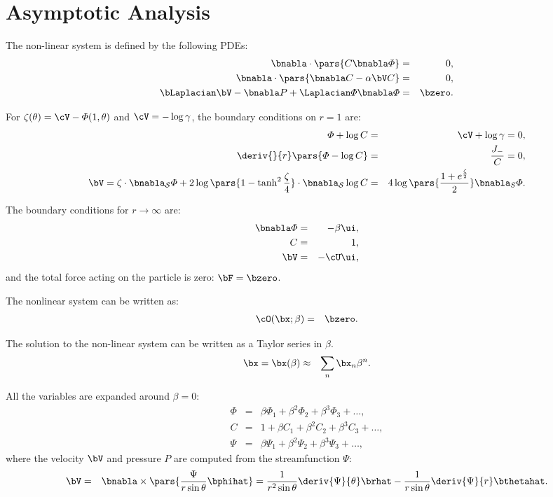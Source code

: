 
\section{Asymptotic Analysis} \label{asymptotic}

The non-linear system is defined by the following PDEs:
\label{PDEs}
\begin{eqnarray*}
\bnabla \cdot \pars{C \bnabla \varPhi} &=& 0, \\
\bnabla \cdot \pars{\bnabla C - \alpha \bV C} &=& 0, \\
\bLaplacian \bV - \bnabla P + \Laplacian \varPhi \bnabla \varPhi &=& \bzero.
\end{eqnarray*}

For $\zeta(\theta) = \cV - \varPhi(1, \theta)$ and 
$\cV = -\log \gamma$, the boundary conditions on $r = 1$ are:
\begin{eqnarray*}
\varPhi + \log C &=& \cV + \log \gamma = 0, \\
\deriv{}{r}\pars{\varPhi - \log C} &=& \frac{J_-}{C} = 0, \\
\bV = \zeta \cdot \bnabla_\mathcal{S} \varPhi 
+ 2\log\pars{1-\tanh^2\frac{\zeta}{4}} \cdot \bnabla_\mathcal{S} \log C
&=& 4\log\pars{\frac{1 + e^\frac{\zeta}{2}}{2}} \bnabla_S \varPhi.
\end{eqnarray*}

The boundary conditions for $r \rightarrow \infty$ are:
\begin{eqnarray*}
\bnabla \varPhi &=& -\beta \ui, \\
C &=& 1, \\
\bV &=& -\cU \ui,
\end{eqnarray*}
and the total force acting on the particle is zero: $\bF = \bzero$.

The nonlinear system can be written as: 
\begin{eqnarray*}
\cO(\bx;\beta) &=& \bzero.
\end{eqnarray*}

The solution to the non-linear system can be written as a Taylor series in $\beta$.
\begin{eqnarray*}
\bx = \bx(\beta) &\approx& \sum_n \bx_n \beta^n.
\end{eqnarray*}

All the variables are expanded around $\beta = 0$:
\begin{eqnarray*}
\varPhi &=& \beta \varPhi_1 + \beta^2 \varPhi_2 + \beta^3 \varPhi_3 + \ldots, \\
C &=& 1 + \beta C_1 + \beta^2 C_2 + \beta^3 C_3 + \ldots, \\
\Psi &=& \beta \Psi_1 + \beta^2 \Psi_2 + \beta^3 \Psi_3 + \ldots ,
\end{eqnarray*}
where the velocity $\bV$ and pressure $P$ are computed from the streamfunction $\Psi$:
\begin{eqnarray*}
\bV &=& \bnabla \times \pars{\frac{\Psi}{r \sin\theta} \bphihat} 
= \frac{1}{r^2 \sin\theta} \deriv{\Psi}{\theta} \brhat 
- \frac{1}{r \sin\theta} \deriv{\Psi}{r} \bthetahat.
\end{eqnarray*}

